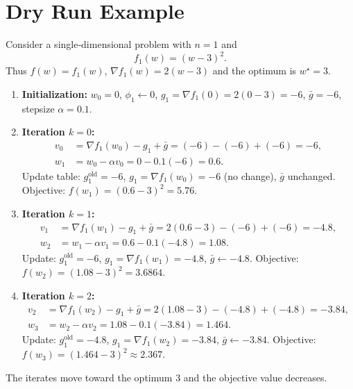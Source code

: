\documentclass{article}
\newcommand{\grad}{\nabla}
\begin{document}
\section*{Dry Run Example}
Consider a single‑dimensional problem with $n=1$ and
\[
f_1(w) = (w-3)^2 .
\]
Thus $f(w)=f_1(w)$, $\grad f_1(w)=2(w-3)$ and the optimum is $w^\star=3$.

\begin{enumerate}
\item \textbf{Initialization:} $w_0=0$, $\phi_1\gets 0$, $g_1=\grad f_1(0)=2(0-3)=-6$, $\bar g = -6$, stepsize $\alpha=0.1$.
\item \textbf{Iteration $k=0$:}
    \begin{align*}
    v_0 &= \grad f_1(w_0)-g_1+\bar g = (-6)-(-6)+(-6) = -6,\\
    w_1 &= w_0-\alpha v_0 = 0-0.1(-6)=0.6.
    \end{align*}
    Update table: $g_1^{\text{old}}=-6$, $g_1=\grad f_1(w_0)= -6$ (no change), $\bar g$ unchanged.
    Objective: $f(w_1) = (0.6-3)^2 = 5.76$.
\item \textbf{Iteration $k=1$:}
    \begin{align*}
    v_1 &= \grad f_1(w_1)-g_1+\bar g = 2(0.6-3)-(-6)+(-6) = -4.8,\\
    w_2 &= w_1-\alpha v_1 = 0.6-0.1(-4.8)=1.08.
    \end{align*}
    Update: $g_1^{\text{old}}=-6$, $g_1=\grad f_1(w_1)=-4.8$, $\bar g\gets -4.8$.
    Objective: $f(w_2)=(1.08-3)^2=3.6864$.
\item \textbf{Iteration $k=2$:}
    \begin{align*}
    v_2 &= \grad f_1(w_2)-g_1+\bar g = 2(1.08-3)-(-4.8)+(-4.8)= -3.84,\\
    w_3 &= w_2-\alpha v_2 = 1.08-0.1(-3.84)=1.464.
    \end{align*}
    Update: $g_1^{\text{old}}=-4.8$, $g_1=\grad f_1(w_2)=-3.84$, $\bar g\gets -3.84$.
    Objective: $f(w_3)=(1.464-3)^2\approx 2.367$.
\end{enumerate}
The iterates move toward the optimum $3$ and the objective value decreases.

\newpage
\end{document}
